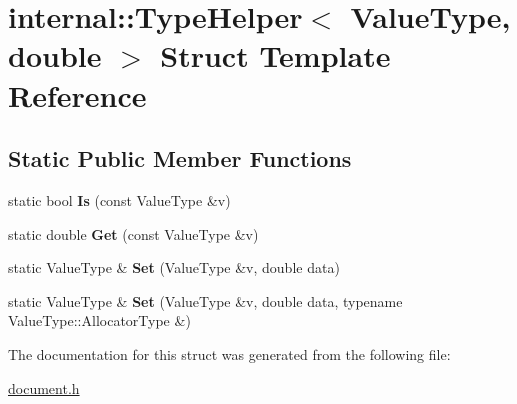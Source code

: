 \hypertarget{a00313}{}\section{internal\+:\+:Type\+Helper$<$ Value\+Type, double $>$ Struct Template Reference}
\label{a00313}
\subsection*{Static Public Member Functions}
\begin{DoxyCompactItemize}
\item 
static bool {\bfseries Is} (const Value\+Type \&v)\hypertarget{a00313_a6c265a3202beb9bd85ecc7896a8ab9dd}{}\label{a00313_a6c265a3202beb9bd85ecc7896a8ab9dd}

\item 
static double {\bfseries Get} (const Value\+Type \&v)\hypertarget{a00313_ac55a96d2abd1dd6718a6cb3d6690aa38}{}\label{a00313_ac55a96d2abd1dd6718a6cb3d6690aa38}

\item 
static Value\+Type \& {\bfseries Set} (Value\+Type \&v, double data)\hypertarget{a00313_a2b332dd6083278283289e107caff879b}{}\label{a00313_a2b332dd6083278283289e107caff879b}

\item 
static Value\+Type \& {\bfseries Set} (Value\+Type \&v, double data, typename Value\+Type\+::\+Allocator\+Type \&)\hypertarget{a00313_a69f7d942a569f3acdeb64127b2ecd9eb}{}\label{a00313_a69f7d942a569f3acdeb64127b2ecd9eb}

\end{DoxyCompactItemize}


The documentation for this struct was generated from the following file\+:\begin{DoxyCompactItemize}
\item 
\hyperlink{a00473}{document.\+h}\end{DoxyCompactItemize}
